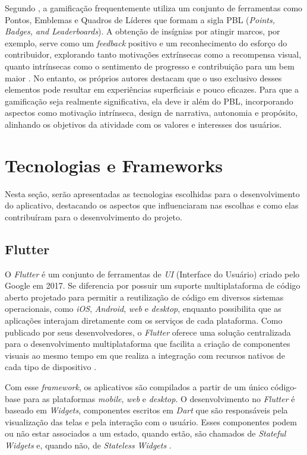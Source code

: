 Segundo , a gamificação frequentemente utiliza um conjunto de ferramentas como Pontos, Emblemas e Quadros de Líderes que formam a sigla PBL (\textit{Points, Badges, and Leaderboards}). A obtenção de insígnias por atingir marcos, por exemplo, serve como um \textit{feedback} positivo e um reconhecimento do esforço do contribuidor, explorando tanto motivações extrínsecas como a recompensa visual, quanto intrínsecas como o sentimento de progresso e contribuição para um bem maior \cite{kapp2012gamification}. No entanto, os próprios autores destacam que o uso exclusivo desses elementos pode resultar em experiências superficiais e pouco eficazes. Para que a gamificação seja realmente significativa, ela deve ir além do PBL, incorporando aspectos como motivação intrínseca, design de narrativa, autonomia e propósito, alinhando os objetivos da atividade com os valores e interesses dos usuários.

\section{Tecnologias e Frameworks}\label{tecnologias}

Nesta seção, serão apresentadas as tecnologias escolhidas para o 
desenvolvimento do aplicativo, destacando os aspectos que influenciaram nas 
escolhas e como elas contribuíram para o desenvolvimento do projeto.

\subsection{Flutter}

O \textit{Flutter} é um conjunto de ferramentas de \textit{UI} (Interface do Usuário) criado 
pelo Google em 2017. Se diferencia por possuir um suporte multiplataforma de código aberto 
projetado para permitir a reutilização de código em diversos sistemas operacionais, como \textit{iOS}, \textit{Android}, \textit{web} e \textit{desktop}, enquanto possibilita que as aplicações interajam diretamente com os serviços de cada plataforma. Como publicado por seus desenvolvedores, o \textit{Flutter} oferece uma solução centralizada para o desenvolvimento multiplataforma que facilita a criação de componentes visuais ao mesmo tempo em que realiza a integração com recursos nativos de cada tipo de dispositivo \cite{flutterDocs2025}.

Com esse \textit{framework}, os aplicativos são compilados a partir de um único código-base para as plataformas \textit{mobile}, \textit{web} e \textit{desktop}. O desenvolvimento no \textit{Flutter} é baseado em \textit{Widgets}, componentes escritos em \textit{Dart} que são responsáveis pela visualização das telas e pela interação com o usuário.
Esses componentes podem ou não estar associados a um estado, quando estão, são chamados de \textit{Stateful} \textit{Widgets} e, quando não, de \textit{Stateless} \textit{Widgets} \cite{flutterDocs2025}.

